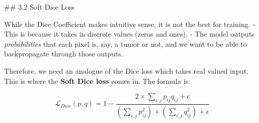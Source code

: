 \documentclass[11pt]{article}
\newenvironment{Shaded}{}{}
\newcommand{\KeywordTok}[1]{\textcolor[rgb]{0.00,0.44,0.13}{\textbf{{#1}}}}
\newcommand{\DecValTok}[1]{\textcolor[rgb]{0.25,0.63,0.44}{{#1}}}
\newcommand{\FloatTok}[1]{\textcolor[rgb]{0.25,0.63,0.44}{{#1}}}
\newcommand{\CommentTok}[1]{\textcolor[rgb]{0.38,0.63,0.69}{\textit{{#1}}}}
\newcommand{\NormalTok}[1]{{#1}}
\newcommand{\OperatorTok}[1]{\textcolor[rgb]{0.40,0.40,0.40}{{#1}}}
\begin{document}
\begin{Shaded}
\end{Shaded}

     \#\# 3.2 Soft Dice Loss

While the Dice Coefficient makes intuitive sense, it is not the best for
training. - This is because it takes in discrete values (zeros and
ones). - The model outputs \emph{probabilities} that each pixel is, say,
a tumor or not, and we want to be able to backpropagate through those
outputs.

Therefore, we need an analogue of the Dice loss which takes real valued
input. This is where the \textbf{Soft Dice loss} comes in. The formula
is:

\[\mathcal{L}_{Dice}(p, q) = 1 - \frac{2\times\sum_{i, j} p_{ij}q_{ij} + \epsilon}{\left(\sum_{i, j} p_{ij}^2 \right) + \left(\sum_{i, j} q_{ij}^2 \right) + \epsilon}\]
\end{document}
